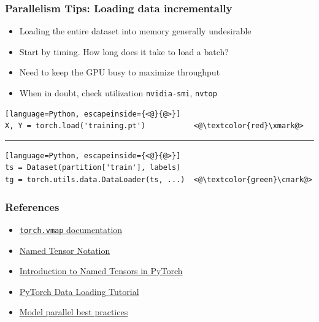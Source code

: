 \documentclass{beamer}
\begin{document}
    \begin{frame}[fragile]
        \frametitle{Parallelism Tips: Loading data incrementally}
        \begin{itemize}
            \item Loading the entire dataset into memory generally undesirable
            \item Start by timing. How long does it take to load a batch?
            \item Need to keep the GPU busy to maximize throughput
            \item When in doubt, check utilization \texttt{nvidia-smi}, \texttt{nvtop}
        \end{itemize}

\begin{lstlisting}[language=Python, escapeinside={<@}{@>}]
X, Y = torch.load('training.pt')           <@\textcolor{red}\xmark@>
\end{lstlisting}
    \noindent\rule{\textwidth}{0.5pt}

\begin{lstlisting}[language=Python, escapeinside={<@}{@>}]
ts = Dataset(partition['train'], labels)
tg = torch.utils.data.DataLoader(ts, ...)  <@\textcolor{green}\cmark@>
\end{lstlisting}
    \end{frame}

    \begin{frame}
        \frametitle{References}
        \begin{itemize}
            \item \href{https://pytorch.org/docs/master/generated/torch.vmap.html}{\texttt{torch.vmap} documentation}
            \item \href{https://namedtensor.github.io/}{Named Tensor Notation}
            \item \href{https://pytorch.org/tutorials/intermediate/named_tensor_tutorial.html}{Introduction to Named Tensors in PyTorch}
            \item \href{https://pytorch.org/tutorials/beginner/data_loading_tutorial.html}{PyTorch Data Loading Tutorial}
            \item \href{https://pytorch.org/tutorials/intermediate/model_parallel_tutorial.html}{Model parallel best practices}
        \end{itemize}
    \end{frame}
\end{document}
